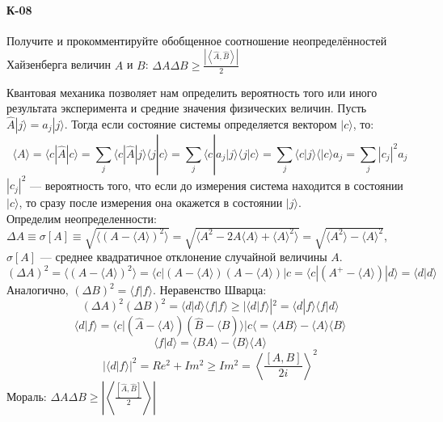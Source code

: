 \documentclass[__main__.tex]{subfiles}
\begin{document}
\paragraph{К-08}
Получите и прокомментируйте обобщенное соотношение неопределённостей Хайзенберга величин $A$ и $B$: $\Delta A\Delta B \ge \frac{\left|\left<\hat{A},\hat{B}\right>\right|}{2}$

Квантовая механика позволяет нам определить вероятность того или иного результата эксперимента и средние значения физических величин. Пусть $\hat{A}|j\rangle=a_j|j\rangle$. Тогда если состояние системы определяется вектором $|c\rangle$, то:
$$
\langle A \rangle =\langle c|\hat{A}|c \rangle = \sum_j \langle c | \hat{A}|j\rangle \langle j|c\rangle = \sum_j \langle c| a_j|j\rangle \langle j|c\rangle = \sum_j\langle c|j\rangle \langle | c \rangle a_j=\sum_j |c_j|^2a_j
$$
$|c_j|^2$ --- вероятность того, что если до измерения система находится в состоянии $|c\rangle$, то сразу после измерения она окажется в состоянии $|j\rangle$.\\

Определим неопределенности: $\Delta A \equiv \sigma[A]\equiv \sqrt{\langle (A-\langle A\rangle)^2\rangle} = \sqrt{\langle A^2-2A\langle A \rangle+\langle A \rangle^2\rangle}=\sqrt{\langle A^2\rangle-\langle A\rangle^2}$, $\sigma [A]$ --- среднее квадратичное отклонение случайной величины $A$.\\
$$
(\Delta A)^2=\langle (A-\langle A\rangle )^2\rangle = \langle c|(A-\langle A\rangle)(A-\langle A\rangle )|c=\langle c|(A^+-\langle A\rangle)|d\rangle = \langle d|d\rangle 
$$
Аналогично, $(\Delta B)^2=\langle f| f \rangle$. Неравенство Шварца:
$$
(\Delta A)^2 (\Delta B)^2 = \langle d|d\rangle \langle f|f \rangle \geqslant |\langle d|f\rangle|^2 = \langle d|f\rangle \langle f|d\rangle
$$
$$
\langle d|f \rangle = \langle c|(\hat{A}-\langle A \rangle)(\hat{B}-\langle B) \rangle | c \langle =\langle AB \rangle -\langle A \rangle \langle B \rangle
$$
$$
\langle f|d \rangle = \langle BA \rangle -\langle B \rangle \langle A \rangle
$$
$$
|\langle d|f \rangle |^2 = Re^2 + Im^2 \geqslant Im^2 = \left \langle \frac{[A, B]}{2i}\right \rangle^2 
$$
Мораль: $\Delta A \Delta B \geqslant \left|\left \langle \frac{[\hat{A}, \hat{B}]}{2}\right \rangle \right|$
\end{document}
